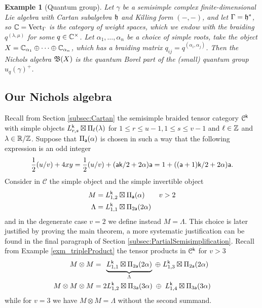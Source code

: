 \documentclass[a4paper, reqno]{amsart}
\newtheorem{example}[theorem]{Example}
\theoremstyle{introTheorems}
\def\CC{\mathbb{C}}
\newcommand\cC{\mathcal{C}}
\newcommand{\Vect}{\textup{Vect}}
\newcommand\g\gamma
\renewcommand{\1}{\mathbbold{1}}
\begin{document}
\begin{example}[Quantum group]
    Let $\g$ be a semisimple complex finite-dimensional Lie algebra with Cartan subalgebra $\mathfrak{h}$ and Killing form $(-,-)$, and let $\Gamma=\mathfrak{h}^*$, so $\CC=\Vect_\Gamma$ is the category of weight spaces, which we endow with the braiding $q^{(\lambda,\mu)}$ for some $q\in \mathbb{C}^ \times$. Let $\alpha_1,\ldots,\alpha_n$ be a choice of simple roots, take the object $X=\mathbb{C}_{\alpha_1}\oplus\cdots\oplus \mathbb{C}_{\alpha_n}$, which has a braiding matrix $q_{ij}=q^{(\alpha_i,\alpha_j)}$. Then the Nichols algebra $\mathfrak{B}(X)$ is the quantum Borel part of the (small) quantum group $u_q(\g)^+$.
\end{example}






\subsection{Our Nichols algebra}\label{subsec:NicholsAlgebra}

Recall from Section \ref{subsec:Cartan} the semisimple braided tensor category $\cC^\k$ with simple objects $L^{\mathsf{k}}_{r,s}\boxtimes \Pi_\ell(\lambda)$
for  $1 \leq r \leq u-1, 1\leq s\leq v-1$ and $\ell\in\mathbb{Z}$ and $\lambda\in \mathbb{R}/\mathbb{Z}$.
Suppose that $\Pi_{\mathsf{a}}(\alpha)$ is chosen in such a way  that the following expression is an odd integer
\begin{align}\label{formula_NicholsParameterCondition}
\frac{1}{2}(u/v)+4xy
=\frac{1}{2}(u/v)+(\mathsf{a} \mathsf{k}/2+2\alpha)\mathsf{a} 
=1+((\mathsf{a}+1)\mathsf{k}/2+2\alpha)\mathsf{a}. 
\end{align}
Consider in $\cC$ the simple object and the simple invertible object
\begin{align*}
M&=L^{\mathsf{k}}_{1,2}\boxtimes\Pi_{\mathsf{a}}(\alpha)
\qquad v> 2
\\
\Lambda&=L^{\mathsf{k}}_{1,1}\boxtimes\Pi_{2\mathsf{a}}(2\alpha)
\end{align*}
and in the degenerate case $v=2$ we define instead $M=\Lambda$. This choice is later justified by proving the main theorem, a more systematic justification can be found in the final paragraph of Section \ref{subsec:PartialSemisimplification}. Recall from Example \ref{exm_tripleProduct} the tensor products in $\mathcal{C}^{\mathsf{k}}$ for $v>3$
\begin{align*}
M\otimes M &= 
\;\,\underbrace{L^{\mathsf{k}}_{1,1}\boxtimes\Pi_{2\mathsf{a}}(2\alpha)}_{\Lambda}
\;\oplus\; 
L^{\mathsf{k}}_{1,3}\boxtimes\Pi_{2\mathsf{a}}(2\alpha)\\
M\otimes M\otimes M
&=2L^{\mathsf{k}}_{1,2}\boxtimes\Pi_{3\mathsf{a}}(3\alpha)
\;\oplus\; 
L^{\mathsf{k}}_{1,4}\boxtimes\Pi_{3\mathsf{a}}(3\alpha)
\end{align*}
while for $v=3$ we have $M\otimes M=\Lambda$ without the second summand.\\
\end{document}
